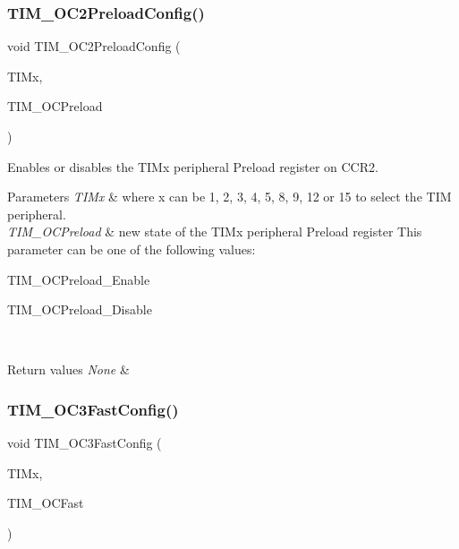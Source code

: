 \subsubsection{\texorpdfstring{TIM\_OC2PreloadConfig()}{TIM\_OC2PreloadConfig()}}
{\footnotesize\ttfamily void T\+I\+M\+\_\+\+O\+C2\+Preload\+Config (\begin{DoxyParamCaption}\item[{\mbox{\hyperlink{struct_t_i_m___type_def}{T\+I\+M\+\_\+\+Type\+Def}} $\ast$}]{T\+I\+Mx,  }\item[{uint16\+\_\+t}]{T\+I\+M\+\_\+\+O\+C\+Preload }\end{DoxyParamCaption})}



Enables or disables the T\+I\+Mx peripheral Preload register on C\+C\+R2. 


\begin{DoxyParams}{Parameters}
{\em T\+I\+Mx} & where x can be 1, 2, 3, 4, 5, 8, 9, 12 or 15 to select the T\+IM peripheral. \\
\hline
{\em T\+I\+M\+\_\+\+O\+C\+Preload} & new state of the T\+I\+Mx peripheral Preload register This parameter can be one of the following values\+: \begin{DoxyItemize}
\item T\+I\+M\+\_\+\+O\+C\+Preload\+\_\+\+Enable \item T\+I\+M\+\_\+\+O\+C\+Preload\+\_\+\+Disable \end{DoxyItemize}
\\
\hline
\end{DoxyParams}

\begin{DoxyRetVals}{Return values}
{\em None} & \\
\hline
\end{DoxyRetVals}
\mbox{\label{group___t_i_m___private___functions_gab2f3698e6e56bd9b0a4be7056ba789e1}} 
\subsubsection{\texorpdfstring{TIM\_OC3FastConfig()}{TIM\_OC3FastConfig()}}
{\footnotesize\ttfamily void T\+I\+M\+\_\+\+O\+C3\+Fast\+Config (\begin{DoxyParamCaption}\item[{\mbox{\hyperlink{struct_t_i_m___type_def}{T\+I\+M\+\_\+\+Type\+Def}} $\ast$}]{T\+I\+Mx,  }\item[{uint16\+\_\+t}]{T\+I\+M\+\_\+\+O\+C\+Fast }\end{DoxyParamCaption})}



